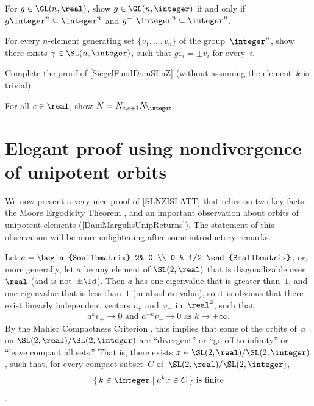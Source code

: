 \begin{exercises}
\item 
For $g \in \GL(n,\real)$, show $g \in \GL(n,\integer)$ if and only if $g \integer^n \subseteq \integer^n$ and $g^{-1} \integer^n \subseteq \integer^n$.

\item \label{eig=pmvi}
For every $n$-element generating set $\{v_1,\ldots,v_n\}$ of the group~$\integer^n$, show there exists $\gamma \in \SL(n,\integer)$, such that $g \varepsilon_i = \pm v_i$ for every~$i$.

\item \label{SiegelSLnZ-knoteEx}
Complete the proof of \cref{SiegelFundDomSLnZ}  (without assuming the element~$k$ is trivial).

\item \label{N=NZN01}
For all $c \in \real$, show $N =  N_{c, c+1} N_{\integer}$.


\end{exercises}




\section{Elegant proof using nondivergence of unipotent orbits} \label{SLNZISLATTSlickSect}

We now present a very nice proof of \cref{SLNZISLATT} that relies on two key facts: the Moore Ergodicity Theorem , and an important observation about orbits of unipotent elements (\cref{DaniMargulisUnipReturns}).
The statement of this observation will be more enlightening after some introductory remarks.

\begin{eg} \label{SplitDivergeSL2R}
Let $a = \begin{Smallbmatrix} 2& 0 \\ 0 & 1/2 \end{Smallbmatrix}$, or, more generally, let $a$ be any element of $\SL(2,\real)$ that is diagonalizable over~$\real$ (and is not~$\pm\Id$). Then $a$ has one eigenvalue that is greater than~$1$, and one eigenvalue that is less than~$1$ (in absolute value), so it is obvious that there exist linearly independent vectors $v_+$ and~$v_-$ in~$\real^2$, such that 
	$$ \text{$a^k v_+ \to 0$ \ and \ $a^{-k} v_- \to 0$ \  as $k \to +\infty$} . $$
By the Mahler Compactness Criterion , this implies that some of the orbits of~$a$ on $\SL(2,\real)/\SL(2,\integer)$ are ``divergent'' or ``go off to infinity'' or ``leave compact all sets\zz.'' That is, there exists $x \in \SL(2,\real)/\SL(2,\integer)$, such that, for every compact subset~$C$ of~$\SL(2,\real)/\SL(2,\integer)$,
	$$ \text{$\{\, k \in \integer \mid a^k x \in C \,\}$ is finite} $$
. 
\end{eg}

